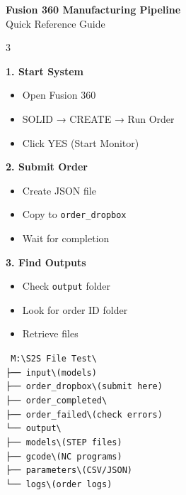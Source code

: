 \documentclass[10pt,landscape]{article}
\begin{document}
\begin{center}
{\huge\textbf{Fusion 360 Manufacturing Pipeline}}\\
\large Quick Reference Guide
\end{center}

\vspace{0.3cm}

\begin{multicols}{3}

\begin{tcolorbox}[colback=blue!10,colframe=blue!70!black,title=\textbf{Quick Start}]
\textbf{1. Start System}
\begin{itemize}[noitemsep,leftmargin=*]
    \item Open Fusion 360
    \item SOLID → CREATE → Run Order
    \item Click YES (Start Monitor)
\end{itemize}

\textbf{2. Submit Order}
\begin{itemize}[noitemsep,leftmargin=*]
    \item Create JSON file
    \item Copy to \texttt{order\_dropbox}
    \item Wait for completion
\end{itemize}

\textbf{3. Find Outputs}
\begin{itemize}[noitemsep,leftmargin=*]
    \item Check \texttt{output} folder
    \item Look for order ID folder
    \item Retrieve files
\end{itemize}
\end{tcolorbox}

\vspace{0.2cm}

\begin{tcolorbox}[colback=green!10,colframe=green!70!black,title=\textbf{Folder Structure}]
\texttt{\small
M:\textbackslash S2S File Test\textbackslash\\
├── input\textbackslash (models)\\
├── order\_dropbox\textbackslash (submit here)\\
├── order\_completed\textbackslash\\
├── order\_failed\textbackslash (check errors)\\
└── output\textbackslash\\
\quad ├── models\textbackslash (STEP files)\\
\quad ├── gcode\textbackslash (NC programs)\\
\quad ├── parameters\textbackslash (CSV/JSON)\\
\quad └── logs\textbackslash (order logs)
}
\end{tcolorbox}


\end{multicols}
\end{document}
